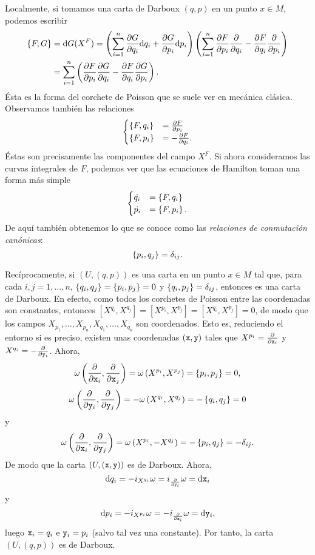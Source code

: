 Localmente, si tomamos una carta de Darboux $(q,p)$ en un punto $x\in M$, podemos escribir
  \begin{align*}
    \left\lbrace F,G\right\rbrace & = \mathrm{d} G (X^F) = \left( \sum_{i=1}^n \frac{\partial G}{\partial q_i} \mathrm{d} q_i + \frac{\partial G}{\partial p_i} \mathrm{d} p_i \right) \left( \sum_{i=1}^n \frac{\partial F}{\partial p_i} \frac{\partial}{\partial q_i} - \frac{\partial F}{\partial q_i} \frac{\partial}{\partial p_i}\right) \\ 
    & =\sum_{i=1}^n\left( \frac{\partial F}{\partial p_i} \frac{\partial G}{\partial q_i} - \frac{\partial F}{\partial q_i} \frac{\partial G}{\partial p_i}\right).
  \end{align*}
  Ésta es la forma del corchete de Poisson que se suele ver en mecánica clásica. Observamos también las relaciones
  \begin{equation*}
    \begin{cases}
    \left\lbrace F,q_i\right\rbrace &= \frac{\partial F}{\partial p_i} \\
    \left\lbrace F,p_i\right\rbrace &= -\frac{\partial F}{\partial q_i}.
  \end{cases}
  \end{equation*}
Éstas son precisamente las componentes del campo $X^F$. Si ahora consideramos las curvas integrales de $F$, podemos ver que las ecuaciones de Hamilton toman una forma más simple
  \begin{equation*}
    \begin{cases}
      \dot{q_i} &= \left\lbrace F,q_i\right\rbrace \\
      \dot{p_i} &= \left\lbrace F,p_i\right\rbrace.
  \end{cases}
  \end{equation*}
  De aquí también obtenemos lo que se conoce como las \emph{relaciones de conmutación canónicas}:
  \begin{equation*}
    \left\lbrace p_i,q_j\right\rbrace=\delta_{ij}.
  \end{equation*}

  Recíprocamente, si $(U,(q,p))$ es una carta en un punto $x\in M$ tal que, para cada $i,j=1,\dots,n$, $\left\lbrace q_i,q_j\right\rbrace=\left\lbrace p_i,p_j\right\rbrace=0$ y $\left\lbrace q_i,p_j\right\rbrace=\delta_{ij}$, entonces es una carta de Darboux. En efecto, como todos los corchetes de Poisson entre las coordenadas son constantes, entonces $\left[ X^{q_i},X^{q_j} \right]=\left[ X^{p_i},X^{p_j} \right]=\left[ X^{q_i},X^{p_j} \right]=0$, de modo que los campos $X_{p_1},\dots,X_{p_n},X_{q_1},\dots,X_{q_n}$ son coordenados. Esto es, reduciendo el entorno si es preciso, existen unas coordenadas $(\mathtt{x},\mathtt{y})$ tales que $X^{p_i}=\frac{\partial}{\partial \mathtt{x}_i}$ y $X^{q_i}=-\frac{\partial}{\partial \mathtt{y}_i}$. Ahora, $$\omega\left(\frac{\partial}{\partial \mathtt{x}_i},\frac{\partial}{\partial \mathtt{x}_j}\right)=\omega\left( X^{p_i},X^{p_j} \right)=\left\{ p_i,p_j \right\}=0,$$ $$\omega\left( \frac{\partial}{\partial \mathtt{y}_i},\frac{\partial}{\partial \mathtt{y}_j} \right)=-\omega\left( X^{q_i},X^{q_j} \right)=-\left\{ q_i,q_j \right\}=0$$ y $$\omega\left( \frac{\partial}{\partial \mathtt{x}_i},\frac{\partial}{\partial \mathtt{y}_j} \right)=\omega\left( X^{p_i},-X^{q_j} \right)=-\left\{ p_i,q_j \right\}=-\delta_{ij}.$$ 
  De modo que la carta $(U,(\mathtt{x},\mathtt{y}))$ es de Darboux. Ahora, $$\mathrm{d} q_i=-i_{X^{q_i}}\omega=i_{\frac{\partial}{\partial \mathtt{y}_i}}\omega=\mathrm{d} \mathtt{x}_i$$ y $$\mathrm{d} p_i=-i_{X^{p_i}}\omega=-i_{\frac{\partial}{\partial \mathtt{x}_i}}\omega=\mathrm{d} \mathtt{y}_i,$$ luego $\mathtt{x}_i=q_i$ e $\mathtt{y}_i=p_i$ (salvo tal vez una constante). Por tanto, la carta $(U,(q,p))$ es de Darboux.

